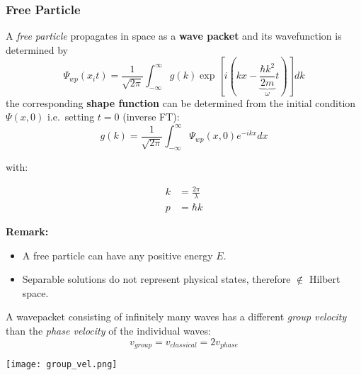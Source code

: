\subsubsection{Free Particle}
A \textit{free particle} propagates in space as a \textbf{wave packet} and its wavefunction is determined by
\noindent\begin{equation*}
    \Psi_{wp}(x_{i}t)=\frac{1}{\sqrt{2\pi}}\int_{-\infty}^{\infty}g(k)\exp\left[i\left(kx- \underbrace{\frac{\hbar k^{2}}{2m}}_{\omega}t\right)\right]dk
\end{equation*}
the corresponding \textbf{shape function} can be determined from the initial condition $\Psi(x,0)$ i.e.\ setting $t=0$ (inverse FT):
\noindent\begin{equation*}
    g(k)=\frac{1}{\sqrt{2\pi}}\int_{-\infty}^{\infty}\Psi_{wp}(x,0)e^{-ikx}dx
\end{equation*}

with:

\begin{align*}
    k & = \frac{2\pi}{\lambda} \\
    p & = \hbar k
\end{align*}

\textbf{Remark:}

\begin{itemize}
    \item A free particle can have any positive energy $E$.
    \item Separable solutions do not represent physical states, therefore $\notin$ Hilbert space.
\end{itemize}


A wavepacket consisting of infinitely many waves has a different \textit{group velocity} than the \textit{phase velocity} of the individual waves:
\noindent\begin{equation*}
    v_{group} = v_{classical} = 2v_{phase}
\end{equation*}

\begin{center}
    \texttt{[image: group\_vel.png]}
\end{center}


